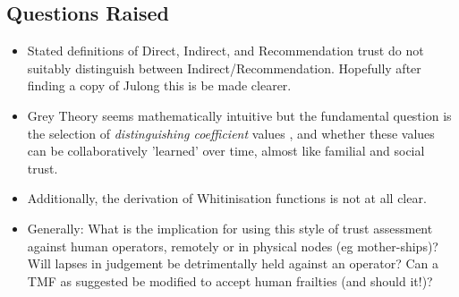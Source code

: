 \subsection{Questions Raised}
\begin{itemize}
  \item Stated definitions of Direct, Indirect, and Recommendation trust do not
  suitably distinguish between Indirect/Recommendation. Hopefully after finding
  a copy of Julong this is be made clearer.
  \item Grey Theory seems mathematically intuitive but the fundamental question
    is the selection of \emph{distinguishing coefficient} values \cite{Cai2009}, and
  whether these values can be collaboratively 'learned' over time, almost like familial
  and social trust.
  \item Additionally, the derivation of Whitinisation functions is not at all
  clear.
  \item Generally: What is the implication for using this style of trust
  assessment against human operators, remotely or in physical nodes (eg
  mother-ships)? Will lapses in judgement be detrimentally held against an
  operator? Can a TMF as suggested be modified to accept human frailties (and
  should it!)?
\end{itemize}
